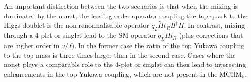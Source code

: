 %
%



An important distinction between the two scenarios is that when the
mixing is dominated by the nonet, the leading order operator coupling
the top quark to the Higgs doublet is the non-renormalisable operator
${\bar q}_L \tilde{H} t_R H^\dagger H$.  In contrast, mixing through a
4-plet or singlet lead to the SM operator ${\bar q}_L \tilde{H} t_R$
(plus corrections that are higher order in $v/f$).  In the former case
the ratio of the top Yukawa coupling to the top mass is three times
larger than in the second case.  Cases where the nonet plays a
comparable role to the 4-plet or singlet can then lead to interesting
enhancements in the top Yukawa coupling, which are not present in the
MCHM$_5$.


